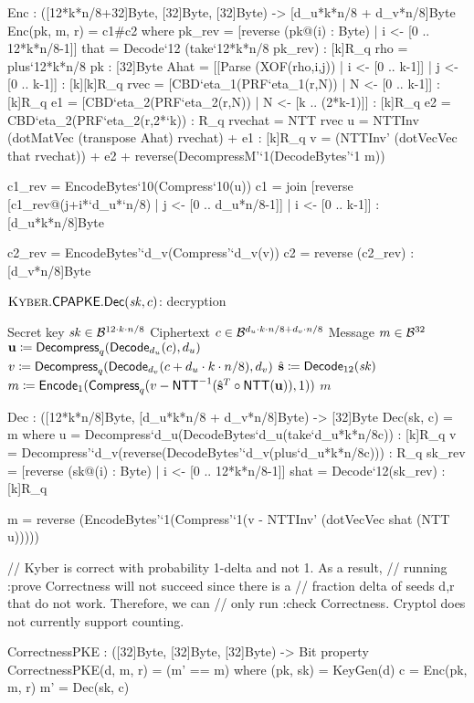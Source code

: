 \begin{code}
  Enc : ([12*k*n/8+32]Byte, [32]Byte, [32]Byte) -> [d_u*k*n/8 + d_v*n/8]Byte
  Enc(pk, m, r) = c1#c2 where
    pk_rev = [reverse (pk@(i) : Byte) | i <- [0 .. 12*k*n/8-1]]
    that = Decode`{12} (take`{12*k*n/8} pk_rev) : [k]R_q
    rho = plus`{12*k*n/8} pk : [32]Byte
    Ahat = [[Parse (XOF(rho,i,j)) | i <- [0 .. k-1]] | j <- [0 .. k-1]] : [k][k]R_q
    rvec = [CBD`{eta_1}(PRF`{eta_1}(r,N)) | N <- [0 .. k-1]] : [k]R_q
    e1 = [CBD`{eta_2}(PRF`{eta_2}(r,N)) | N <- [k .. (2*k-1)]] : [k]R_q
    e2 = CBD`{eta_2}(PRF`{eta_2}(r,2*`k)) : R_q
    rvechat = NTT rvec
    u = NTTInv (dotMatVec (transpose Ahat) rvechat) + e1 : [k]R_q
    v = (NTTInv' (dotVecVec that rvechat)) + e2 + reverse(DecompressM'`{1}(DecodeBytes'`{1} m))

    c1_rev = EncodeBytes`{10}(Compress`{10}(u))
    c1 = join [reverse [c1_rev@(j+i*`d_u*`n/8) | j <- [0 .. d_u*n/8-1]] | i <- [0 .. k-1]] : [d_u*k*n/8]Byte
    
    c2_rev = EncodeBytes'`{d_v}(Compress'`{d_v}(v))
    c2 = reverse (c2_rev) : [d_v*n/8]Byte    
\end{code}

\begin{algorithm}
  \caption{$\text{{\sc Kyber}}.{\sf CPAPKE}.\mathsf{Dec}(\mathit{sk},c)$: decryption\label{kybercpa-dec}}
  \begin{algorithmic}[1]
    \Require Secret key $\mathit{sk} \in \mathcal{B}^{12\cdot k\cdot n/8}$
    \Require Ciphertext $c \in \mathcal{B}^{d_u\cdot k\cdot n/8 + d_v\cdot n/8}$
    \Ensure Message $m \in \mathcal{B}^{32}$
    \State $\mathbf{u} \coloneqq \mathsf{Decompress}_q(\mathsf{Decode}_{d_u}(c),d_u)$
    \State $v \coloneqq \mathsf{Decompress}_q(\mathsf{Decode}_{d_v}(c+d_u\cdot k\cdot n/8),d_v)$
    \State $\hat{\mathbf{s}} \coloneqq \mathsf{Decode}_{12}(\mathit{sk})$
    \State $m \coloneqq \mathsf{Encode}_1(\mathsf{Compress}_q(v-\mbox{\textsf{NTT}}^{-1}(\hat{\mathbf{s}}^T\circ\mbox{\textsf{NTT}}(\mathbf{u})),1))$ \label{line:decrypt} 
    \State \Return $m$
\end{algorithmic}
\end{algorithm}

\begin{code}
  Dec : ([12*k*n/8]Byte, [d_u*k*n/8 + d_v*n/8]Byte) -> [32]Byte
  Dec(sk, c) = m where
    u = Decompress`{d_u}(DecodeBytes`{d_u}(take`{d_u*k*n/8}c))   : [k]R_q
    v = Decompress'`{d_v}(reverse(DecodeBytes'`{d_v}(plus`{d_u*k*n/8}c))) : R_q
    sk_rev = [reverse (sk@(i) : Byte) | i <- [0 .. 12*k*n/8-1]]
    shat = Decode`{12}(sk_rev) : [k]R_q

    m = reverse (EncodeBytes'`{1}(Compress'`{1}(v - NTTInv' (dotVecVec shat (NTT u)))))

  // Kyber is correct with probability 1-delta and not 1. As a result,
  // running :prove Correctness will not succeed since there is a 
  // fraction delta of seeds d,r that do not work. Therefore, we can 
  // only run :check Correctness. Cryptol does not currently support counting.

  CorrectnessPKE : ([32]Byte, [32]Byte, [32]Byte) -> Bit
  property CorrectnessPKE(d, m, r) = (m' == m) where
    (pk, sk) = KeyGen(d)
    c = Enc(pk, m, r)
    m' = Dec(sk, c)
\end{code}

